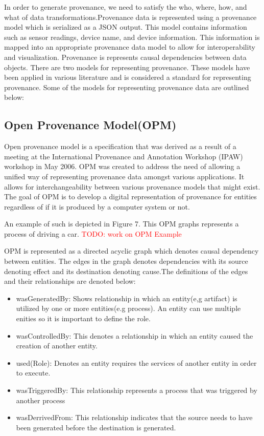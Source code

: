 In order to generate provenance, we need to satisfy the who, where, how, and what of data transformations.Provenance data is represented using a provenance model which is serialized as a JSON output. This model contains information such as sensor readings, device name, and device information. This information is mapped into an appropriate provenance data model  to allow for interoperability and visualization. Provenance is represents causal dependencies between data objects. There are two models for representing provenance. These models have been applied in various literature and is considered a standard for representing provenance. Some of the models for representing provenance data are outlined below:

\subsection{Open Provenance Model(OPM)}

Open provenance model is a specification that was derived as a result of a meeting at the International Provenance and Annotation Workshop (IPAW) workshop in May 2006. OPM was created to address the need of allowing a unified way of representing provenance data amongst various applications. It allows for interchangeability between various provenance models that might exist. The goal of OPM is to develop a digital representation of provenance for entities regardless of if it is produced by a computer system or not. 

An example of such is depicted in Figure 7. This OPM graphs represents a process of driving a car.  \textcolor{red}{TODO: work on OPM Example}



OPM is represented as a directed acyclic graph which denotes causal dependency between entities. The edges in the graph denotes dependencies with its source denoting effect and its destination denoting cause.The definitions of the edges and their relationships are denoted below: 


\begin{itemize}
\item wasGeneratedBy: Shows relationship in which an entity(e,g artifact) is utilized by one or  more entities(e.g process). An entity can use multiple enities so it is important to define the role.  
\item wasControlledBy: This denotes a relationship in which an entity caused the creation of another entity.
\item used(Role): Denotes an entity requires the services of another entity in order to execute.
\item wasTriggeredBy: This relationship represents a process that was triggered by another process
\item wasDerrivedFrom: This relationship indicates that the source needs to have been generated before the destination is generated.
\end{itemize}


